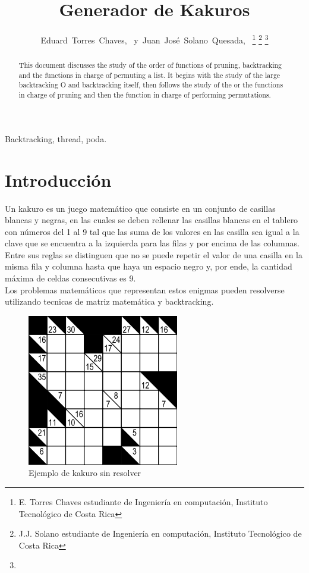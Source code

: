 \documentclass[journal]{IEEEtran}
\begin{document}
\title{Generador de Kakuros}
\author{Eduard~Torres~Chaves,~\IEEEmembership{}
        y~Juan~José~Solano~Quesada,~\IEEEmembership{}
\thanks{E. Torres Chaves estudiante de Ingeniería en computación, Instituto Tecnológico de Costa Rica}%
\thanks{J.J. Solano estudiante de Ingeniería en computación, Instituto Tecnológico de Costa Rica}%
\thanks{}}
\maketitle
\begin{abstract}
This document discusses the study of the order of functions of pruning, backtracking and the functions in charge of permuting a list. It begins with the study of the large backtracking O and backtracking itself, then follows the study of the or the functions in charge of pruning and then the function in charge of performing permutations.

\end{abstract}
\begin{IEEEkeywords}
Backtracking, thread, poda.
\end{IEEEkeywords}
\IEEEpeerreviewmaketitle

\section{Introducción}
Un kakuro es un juego matemático que consiste en un conjunto de casillas blancas y negras, en las cuales se deben rellenar las casillas blancas en el tablero con números del 1 al 9 tal que las suma de los valores en las casilla sea igual a la clave que se encuentra a la izquierda para las filas y por encima de las columnas.\\
Entre sus reglas se distinguen que no se puede repetir el valor de una casilla en la misma fila y columna hasta que haya un espacio negro y, por ende, la cantidad máxima de celdas consecutivas es 9.\\
Los problemas matemáticos que representan estos enigmas pueden resolverse utilizando tecnicas de matriz matemática y backtracking.

\begin{figure}[h] 
        \centering \includegraphics[width=.35\columnwidth]{kakuro_blank.png}
        \caption{
                \label{fig:samplesetup}
                Ejemplo de kakuro sin resolver
        }
\end{figure}
\end{document}
